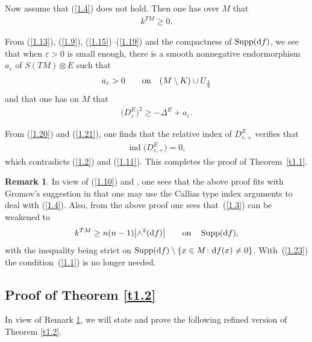\documentclass[pdftex]{sigma}
\numberwithin{equation}{section}
\theoremstyle{definition}
\newtheorem{rem}[thm]{Remark}
\begin{document}
Now assume that (\ref{1.4}) does not hold. Then one has over $M$ that
 \begin{gather}\label{1.19}
k^{TM}\geq 0.
\end{gather}

From (\ref{1.13}), (\ref{1.9}), (\ref{1.15})--(\ref{1.19}) and the compactness of $\operatorname{Supp}({\rm d}f)$, we see that when $\varepsilon>0$ is small enough, there is a smooth nonnegative endormorphism $a_\varepsilon$ of $S(TM)\widehat\otimes E$ such that
 \begin{gather}\label{1.20}
a_\varepsilon>0 \qquad {\rm on}\quad (M\setminus K)\cup U_{\frac{1}{2}}
\end{gather}
and that one has on $M$ that
\begin{gather}\label{1.21}
\big(D_\varepsilon^E\big)^2 \geq -\Delta^E +a_\varepsilon.
\end{gather}

From (\ref{1.20}) and (\ref{1.21}), one finds that the relative index of $D^E_{\varepsilon,+}$ verifies that
\begin{gather*}%
\operatorname{ind}\big(D^E_{\varepsilon,+}\big)=0,
\end{gather*}
which contradicts (\ref{1.2}) and (\ref{1.11}). This completes the proof of Theorem~\ref{t1.1}.

\begin{rem}\label{t1.3}
In view of (\ref{1.10}) and \cite[Section~6$\frac{4}{5}$]{Gr96}, one sees that the above proof fits with Gromov's suggestion in \cite[p.~45]{Gr19} that one may use the Callias type index arguments to deal with (\ref{1.4}). Also, from the above proof one sees that~(\ref{1.3}) can be weakened to
\begin{gather}\label{1.23}
k^{TM}\geq n(n-1)\big|{\wedge}^2({\rm d}f)\big| \qquad {\rm on}\quad \operatorname{Supp}({\rm d}f),
\end{gather}
with the inequality being strict on $\operatorname{Supp}({\rm d}f)\setminus \{x\in M\colon {\rm d}f(x)\neq 0\}$. With~(\ref{1.23}) the condition~(\ref{1.1}) is no longer needed.
\end{rem}

\subsection{Proof of Theorem \ref{t1.2}}\label{s1.3}

In view of Remark \ref{t1.3}, we will state and prove the following refined version of Theorem \ref{t1.2}.
\end{document}
